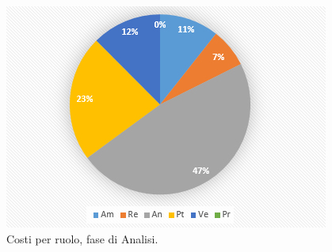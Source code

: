 \documentclass[a4paper]{report}
\begin{document}
			\begin{figure}[H]
				\centering
				\includegraphics[scale=0.7]{PCCostiAnalisi}
				\caption{Costi per ruolo, fase di Analisi.}
			\end{figure}
\end{document}
